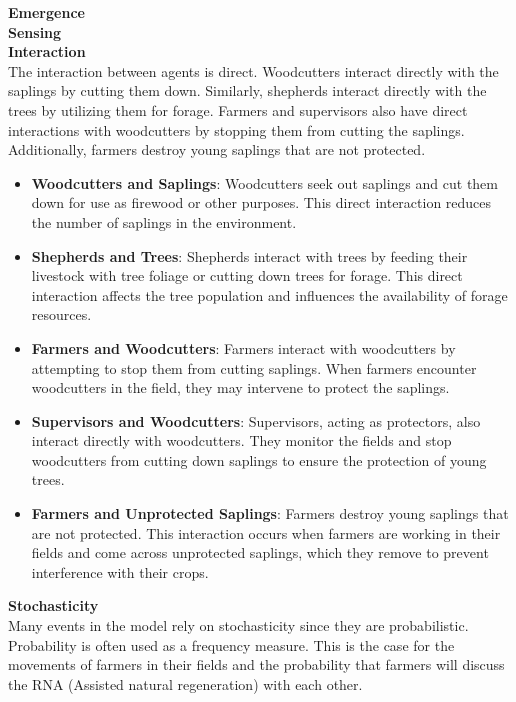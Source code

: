 \documentclass{article}
\begin{document}
        \textbf{Emergence}\\
        \textbf{Sensing}\\
        \textbf{Interaction}\\

        The interaction between agents is direct. Woodcutters interact directly with the saplings by cutting them down. Similarly, shepherds interact directly with the trees by utilizing them for forage. Farmers and supervisors also have direct interactions with woodcutters by stopping them from cutting the saplings. Additionally, farmers destroy young saplings that are not protected.

        \begin{itemize}
            \item \textbf{Woodcutters and Saplings}: Woodcutters seek out saplings and cut them down for use as firewood or other purposes. This direct interaction reduces the number of saplings in the environment.
            \item \textbf{Shepherds and Trees}: Shepherds interact with trees by feeding their livestock with tree foliage or cutting down trees for forage. This direct interaction affects the tree population and influences the availability of forage resources.
            \item \textbf{Farmers and Woodcutters}: Farmers interact with woodcutters by attempting to stop them from cutting saplings. When farmers encounter woodcutters in the field, they may intervene to protect the saplings.
            \item \textbf{Supervisors and Woodcutters}: Supervisors, acting as protectors, also interact directly with woodcutters. They monitor the fields and stop woodcutters from cutting down saplings to ensure the protection of young trees.
            \item \textbf{Farmers and Unprotected Saplings}: Farmers destroy young saplings that are not protected. This interaction occurs when farmers are working in their fields and come across unprotected saplings, which they remove to prevent interference with their crops.
        \end{itemize}

        \textbf{Stochasticity}\\

        Many events in the model rely on stochasticity since they are probabilistic. Probability is often used as a frequency measure. This is the case for the movements of farmers in their fields and the probability that farmers will discuss the RNA (Assisted natural regeneration) with each other.
\end{document}
